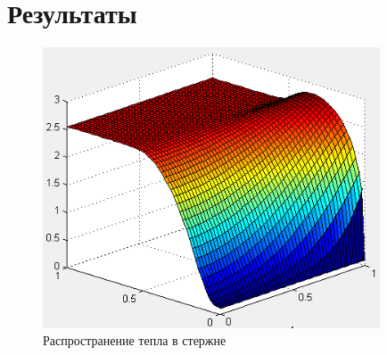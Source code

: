 \documentclass[a4paper,12pt]{article}
\begin{document}
\newpage
\section{Результаты}

\begin{figure}[h]
\centering
\includegraphics[width = 10cm]{screen.png}
\caption{Распространение тепла в стержне}
\label{fig:1}	
\end{figure}
\end{document}
